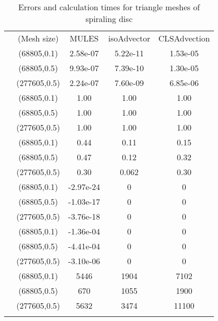 \begin{table}
\centering
\caption{Errors and calculation times for triangle meshes of spiraling disc}
\label{Tab:06}
\begin{tabular}{ccccc}
\hline\noalign{\smallskip}
\quad &(Mesh size) & MULES &isoAdvector &CLSAdvection  \\
\noalign{\smallskip}\hline\noalign{\smallskip}
\multirow{5}{*}{$\varepsilon_{V}$}
&(68805,0.1)& 2.58e-07 &5.22e-11 &1.53e-05  \\
&(68805,0.5) & 9.93e-07 &7.39e-10 &1.30e-05\\
&(277605,0.5)& 2.24e-07 &7.60e-09 &6.85e-06\\
\hline\noalign{\smallskip}
\multirow{5}{*}{$\varepsilon_{M}$}
&(68805,0.1)& 1.00 &1.00 &1.00  \\
&(68805,0.5) & 1.00 &1.00 &1.00\\
&(277605,0.5)& 1.00 &1.00 &1.00\\
\hline\noalign{\smallskip}
\multirow{5}{*}{$\varepsilon_{S}$}
&(68805,0.1)& 0.44 &0.11 &0.15  \\
&(68805,0.5) & 0.47 &0.12 &0.32\\
&(277605,0.5)& 0.30 &0.062 &0.30\\
\hline\noalign{\smallskip}
\multirow{5}{*}{$\min(\alpha)$}
&(68805,0.1)& -2.97e-24 &0 &0  \\
&(68805,0.5) & -1.03e-17 &0 &0\\
&(277605,0.5)& -3.76e-18 &0 &0\\
\hline\noalign{\smallskip}
\multirow{5}{*}{$\max(\alpha)-1$}
&(68805,0.1)& -1.36e-04 &0 &0  \\
&(68805,0.5) & -4.41e-04 &0 &0\\
&(277605,0.5)& -3.10e-06 &0 &0\\
\hline\noalign{\smallskip}
\multirow{5}{*}{$T_{calc}$}
&(68805,0.1)& 5446 &1904 &7102  \\
&(68805,0.5) & 670 &1055 &1900\\
&(277605,0.5)& 5632 &3474 &11100\\
\noalign{\smallskip}\hline
\end{tabular}
\end{table}
